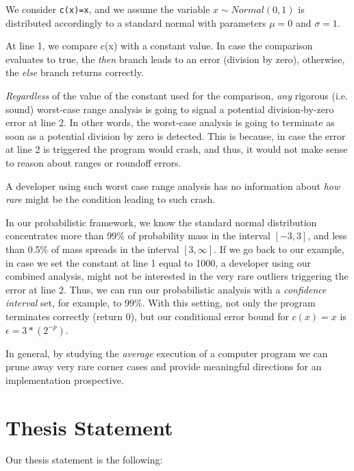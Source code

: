 We consider \lstinline{c(x)=x}, and we assume the variable $x\sim Normal(0,1)$ is distributed accordingly to a standard normal with parameters $\mu = 0$ and $\sigma = 1$.
%

At line 1, we compare c(x) with a constant value.
%
In case the comparison evaluates to true, the \emph{then} branch leads to an error (division by zero), otherwise, the \emph{else} branch returns correctly.
%

\emph{Regardless} of the value of the constant used for the comparison, \emph{any} rigorous (i.e. sound) worst-case range analysis is going to signal a potential division-by-zero error at line 2.
%
In other words, the worst-case analysis is going to terminate as soon as a potential division by zero is detected.
%
This is because, in case the error at line 2 is triggered the program would crash, and thus, it would not make sense to reason about ranges or roundoff errors.

%
A developer using such worst case range analysis has no information about \emph{how rare} might be the condition leading to such crash. 
%

In our probabilistic framework, we know the standard normal distribution concentrates more than 99\% of probability mass in the interval $[−3, 3]$, and less than 0.5\% of mass spreads in the interval $[3, \infty]$.
%
If we go back to our example, in case we set the constant at line 1 equal to 1000, a developer using our combined analysis, might not be interested in the very rare outliers triggering the error at line 2.
%
Thus, we can run our probabilistic analysis with a \emph{confidence interval} set, for example, to 99\%.
%
%
With this setting, not only the program terminates correctly (return 0), but our conditional error bound for $c(x)=x$ is $\epsilon = 3*(2^{-p})$.
%

In general, by studying the \emph{average} execution of a computer program we can prune away very rare corner cases and provide meaningful directions for an implementation prospective.
%
\section{Thesis Statement}
%
Our thesis statement is the following: 

